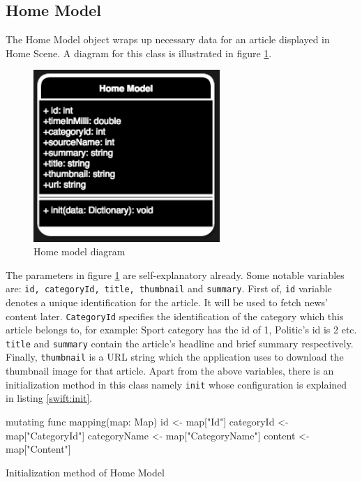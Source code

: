 \documentclass[11pt,a4paper,oneside,article]{memoir}
\begin{document}
\subsection{Home Model}
The Home Model object wraps up necessary data for an article displayed in Home Scene. A diagram for this class is illustrated in figure \ref{fig:homeEntity}.

\begin{figure}[H]

\centering
\includegraphics[width=200pt]{home-entity}

\caption{Home model diagram}
\label{fig:homeEntity}

\end{figure}

The parameters in figure \ref{fig:homeEntity} are self-explanatory already. Some notable variables are: 
\texttt{id, categoryId, title, thumbnail} and \texttt{summary}. First of, \texttt{id} variable denotes a unique identification for the article. It will be used to fetch news' content later. \texttt{CategoryId} specifies the identification of the category which this article belongs to, for example: Sport category has the id of 1, Politic's id is 2 etc. \texttt{title} and \texttt{summary} contain the article's headline and brief summary respectively. Finally, \texttt{thumbnail} is a URL string which the application uses to download the thumbnail image for that article. Apart from the above variables, there is an initialization method in this class namely \texttt{init} whose configuration is explained in listing \ref{swift:init}. 

\begin{listing}[h]
\begin{SwiftCode}
mutating func mapping(map: Map) {
        id <- map["Id"]
        categoryId <- map["CategoryId"]
        categoryName <- map["CategoryName"] 
        content <- map["Content"]
}
\end{SwiftCode}
\caption{Initialization method of Home Model}
\label{swift:init}
\end{listing}
\end{document}
